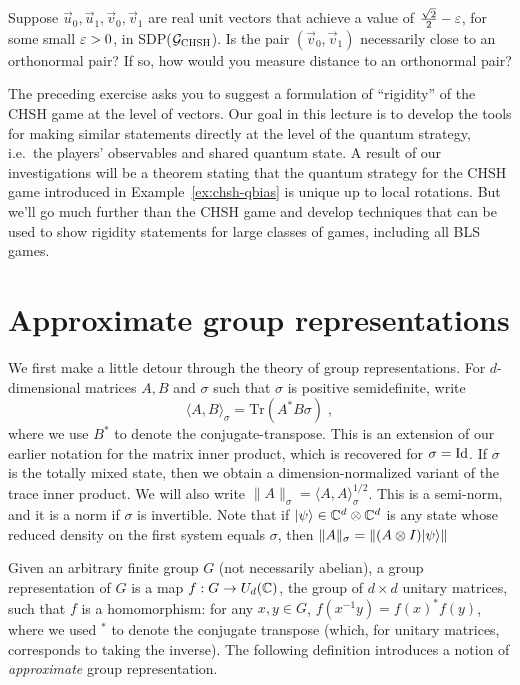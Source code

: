 \begin{exercise}
Suppose $\vec{u}_0,\vec{u}_1,\vec{v}_0,\vec{v}_1$ are real unit vectors that achieve a value of $\frac{\sqrt{2}}{2}-\varepsilon$, for some small $\varepsilon>0$, in SDP($\mathcal{G}_{\textsc{CHSH}}$). Is the pair $(\vec{v}_0,\vec{v}_1)$ necessarily close to an orthonormal pair? If so, how would you measure distance to an orthonormal pair?  
\end{exercise}

The preceding exercise asks you to suggest a formulation of ``rigidity'' of the CHSH game at the level of vectors. Our goal in this lecture is to develop the tools for making similar statements directly at the level of the quantum strategy, i.e.\ the players' observables and shared quantum state. A result of our investigations will be a theorem stating that the quantum strategy for the CHSH game introduced in Example~\ref{ex:chsh-qbias} is  unique up to local rotations. But we'll go much further than the CHSH game and develop techniques that can be used to show rigidity statements for large classes of games, including all BLS games. 


\section{Approximate group representations}
\label{sec:approx-group}

We first make a little detour through the theory of group representations. For $d$-dimensional matrices  $A,B$ and $\sigma$ such that $\sigma$ is positive semidefinite, write 
$$\langle A,B\rangle_\sigma = \mathrm{Tr}(A^* B \sigma)\;,$$
where we use $B^*$ to denote the conjugate-transpose. This is an extension of our earlier notation for the matrix inner product, which is recovered for $\sigma = \mathop{\rm Id}\nolimits$. If $\sigma$ is the totally mixed state, then we obtain a dimension-normalized variant of the trace inner product. We will also write $\|A\|_\sigma = \langle A,A\rangle_\sigma^{1/2}$. This is a semi-norm, and it is a norm if $\sigma$ is invertible. Note that if $|\psi\rangle\in \mathbb{C}^d \otimes \mathbb{C}^d$ is any state whose reduced density on the first system equals $\sigma$, then $\|A\|_\sigma = \| (A\otimes I) |\psi\rangle\|$

Given an arbitrary finite group $G$ (not necessarily abelian), a group representation of $G$ is a map $f:G \to U_d(\mathbb{C})$, the group of $d\times d$ unitary matrices, such that $f$ is a homomorphism: for any $x,y\in G$, $f(x^{-1}y)=f(x)^* f(y)$, where we used $^*$ to denote the conjugate transpose (which, for unitary matrices, corresponds to taking the inverse). The following definition introduces a notion of \emph{approximate} group representation.  

